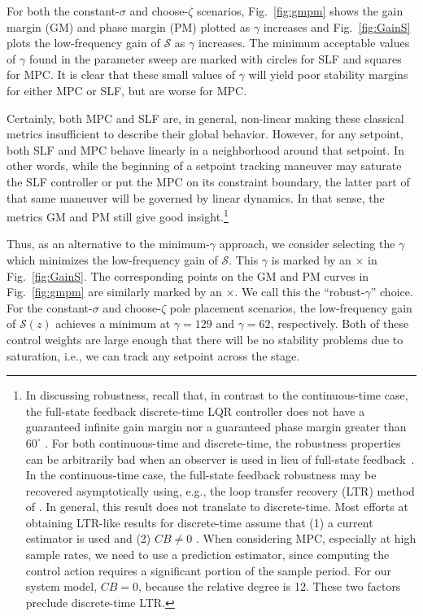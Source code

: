 \documentclass[twocolumn,twoside]{IEEEtran}
\begin{document}
For both the constant-$\sigma$ and choose-$\zeta$ scenarios, Fig.~\ref{fig:gmpm} shows the gain margin (GM) and phase margin (PM) plotted as $\gamma$ increases and Fig.~\ref{fig:GainS} plots the low-frequency gain of $\mathcal{S}$ as $\gamma$ increases. The minimum acceptable values of $\gamma$ found in the parameter sweep are marked with circles for SLF and squares for MPC. It is clear that these small values of $\gamma$ will yield poor stability margins for either MPC or SLF, but are worse for MPC.

Certainly, both MPC and SLF are, in general, non-linear making these classical metrics insufficient to describe their global behavior. However, for any setpoint, both SLF and MPC behave linearly in a neighborhood around that setpoint. In other words, while the beginning of a setpoint tracking maneuver may saturate the SLF controller or put the MPC on its constraint boundary, the latter part of that same maneuver will be governed by linear dynamics. In that sense, the metrics GM and PM still give good insight.\footnote{In discussing robustness, recall that, in contrast to the continuous-time case, the full-state feedback discrete-time LQR controller does not have a guaranteed infinite gain margin nor a guaranteed phase margin greater than $60^{\circ}$ \cite{andersson_moore}. For both continuous-time and discrete-time, the robustness properties can be arbitrarily bad when an observer is used in lieu of full-state feedback~\cite{doyle_guaranteed_1978}. In the continuous-time case, the full-state feedback robustness may be recovered asymptotically using, e.g., the loop transfer recovery (LTR) method of \cite{doyle_robustness_1979}. In general, this result does not translate to discrete-time. Most efforts at obtaining LTR-like results for discrete-time assume that (1) a current estimator is used and (2) $CB\neq 0$ \cite{Maciejowski_asymptotic_1985,guaracy_discrete_2015}. When considering MPC, especially at high sample rates, we need to use a prediction estimator, since computing the control action requires a significant portion of the sample period. For our system model, $CB=0$, because the relative degree is 12. These two factors preclude discrete-time LTR.} %

Thus, as an alternative to the minimum-$\gamma$ approach, we consider selecting the $\gamma$ which minimizes the low-frequency gain of $\mathcal{S}$. This $\gamma$ is marked by an $\times$ in Fig.~\ref{fig:GainS}. The corresponding points on the GM and PM curves in Fig.~\ref{fig:gmpm} are similarly marked by an $\times$. We call this the ``robust-$\gamma$'' choice.  For the constant-$\sigma$ and choose-$\zeta$ pole placement scenarios, the low-frequency gain of $\mathcal{S}(z)$ achieves a minimum at ${\gamma=129}$ and $\gamma=62$, respectively. Both of these control weights are large enough that there will be no stability problems due to saturation, i.e., we can track any setpoint across the stage. 
\end{document}
